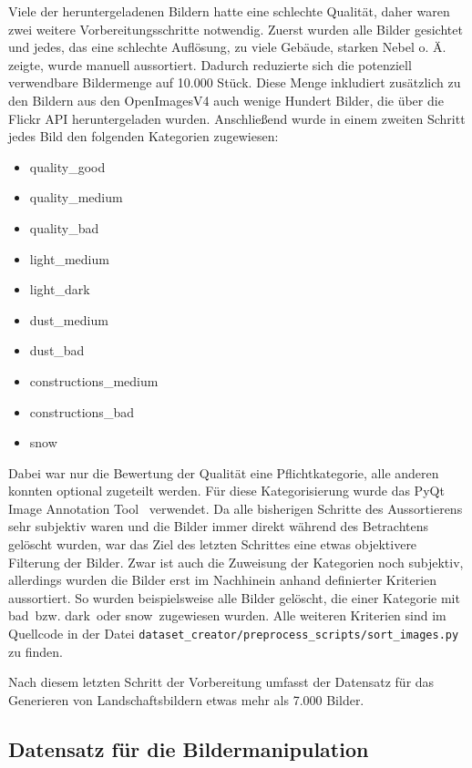 Viele der heruntergeladenen Bildern hatte eine schlechte Qualität, daher waren zwei weitere Vorbereitungsschritte notwendig. Zuerst wurden alle Bilder gesichtet und jedes, das eine schlechte Auflösung, zu viele Gebäude, starken Nebel o. Ä. zeigte, wurde manuell aussortiert. Dadurch reduzierte sich die potenziell verwendbare Bildermenge auf 10.000 Stück. Diese Menge inkludiert zusätzlich zu den Bildern aus den OpenImagesV4 auch wenige Hundert Bilder, die über die Flickr API heruntergeladen wurden. Anschließend wurde in einem zweiten Schritt jedes Bild den folgenden Kategorien zugewiesen:

\begin{itemize}
	\item quality\_good
	\item quality\_medium
	\item quality\_bad
	\item light\_medium
	\item light\_dark
	\item dust\_medium
	\item dust\_bad
	\item constructions\_medium
	\item constructions\_bad
	\item snow
\end{itemize}

Dabei war nur die Bewertung der Qualität eine Pflichtkategorie, alle anderen konnten optional zugeteilt werden. Für diese Kategorisierung wurde das \glqq PyQt Image Annotation Tool\grqq~\cite{brada2022} verwendet. Da alle bisherigen Schritte des Aussortierens sehr subjektiv waren und die Bilder immer direkt während des Betrachtens gelöscht wurden, war das Ziel des letzten Schrittes eine etwas objektivere Filterung der Bilder. Zwar ist auch die Zuweisung der Kategorien noch subjektiv, allerdings wurden die Bilder erst im Nachhinein anhand definierter Kriterien aussortiert. So wurden beispielsweise alle Bilder gelöscht, die einer Kategorie mit \glqq bad\grqq\ bzw. \glqq dark\grqq\ oder \glqq snow\grqq\ zugewiesen wurden. Alle weiteren Kriterien sind im Quellcode in der Datei \texttt{dataset\_creator/preprocess\_scripts/sort\_images.py} zu finden.

Nach diesem letzten Schritt der Vorbereitung umfasst der Datensatz für das Generieren von Landschaftsbildern etwas mehr als 7.000 Bilder.

\subsection{Datensatz für die Bildermanipulation}

